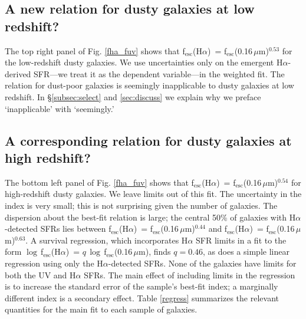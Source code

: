 \documentclass[referee]{aa}
\newcommand{\alephuv}{f$_{\mathrm{esc}}$(0.16$\,\mu$m)}
\newcommand{\alephha}{f$_{\mathrm{esc}}$(H$\alpha$)}
\newcommand{\alephuvha}{f$_{\mathrm{esc}}$(0.66$\,\mu$m)}
\begin{document}
\subsection{A new relation for dusty galaxies at low redshift?}

The top right panel of Fig. \ref{fha_fuv} shows that \alephha~=
\alephuv$^{0.53}$ for the low-redshift
dusty galaxies.  We use uncertainties only on the emergent H$\alpha$-derived
SFR---we treat it as the dependent variable---in the weighted fit.  The relation
for dust-poor galaxies is seemingly inapplicable to dusty galaxies at
low redshift.  In \S\ref{subsec:select} and \ref{sec:discuss} we explain why we
preface `inapplicable' with `seemingly.'


\subsection{A corresponding relation for dusty galaxies at high
redshift?}\label{subsec:highz}

The bottom left panel of Fig. \ref{fha_fuv} shows that \alephha~=
\alephuv$^{0.54}$ for high-redshift
dusty galaxies.  We leave limits out of this fit.  The uncertainty in
the index is very small; this is not surprising given the number of galaxies.
The dispersion about the best-fit relation is large; the central 50\% of
galaxies with H$\alpha$-detected SFRs lies between \alephha~= \alephuv$^{0.44}$
and \alephha~= \alephuv$^{0.63}$.  A survival regression, which incorporates
H$\alpha$ SFR limits in a fit to the form $\log\,$\alephha~=
$q\,\log\,$\alephuv, finds $q = 0.46$, as does a simple linear regression using
only the H$\alpha$-detected SFRs.  None of the galaxies have limits for both
the UV and H$\alpha$ SFRs.  The main effect of including limits in the
regression is to increase the standard error of the sample's best-fit index; a
marginally different index is a secondary effect.  Table \ref{regress}
summarizes the relevant quantities for the main fit to each sample of galaxies.
\end{document}
